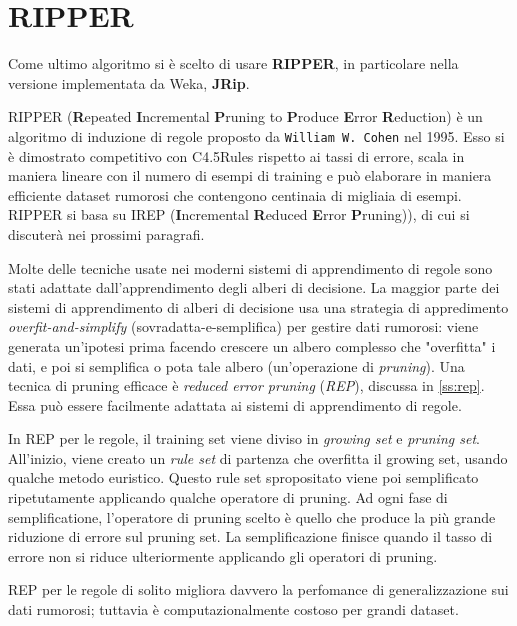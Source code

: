\chapter{RIPPER}
\label{ch:jrip}

Come ultimo algoritmo si è scelto di usare \textbf{RIPPER}\cite{Cohen95fasteffective}, in particolare nella versione implementata da Weka, \textbf{JRip}\cite{Witten:2011:DMP:1972514}.

RIPPER (\textbf{R}epeated \textbf{I}ncremental \textbf{P}runing to \textbf{P}roduce \textbf{E}rror \textbf{R}eduction) è un algoritmo di induzione di regole proposto da \verb|William W. Cohen| nel 1995. Esso si è dimostrato competitivo con C4.5Rules rispetto ai tassi di errore, scala in maniera lineare con il numero di esempi di training e può elaborare in maniera efficiente dataset rumorosi che contengono centinaia di migliaia di esempi. RIPPER si basa su IREP (\textbf{I}ncremental \textbf{R}educed \textbf{E}rror \textbf{P}runing))\cite{Furnkranz94incrementalreduced}, di cui si discuterà nei prossimi paragrafi.

Molte delle tecniche usate nei moderni sistemi di apprendimento di regole  sono stati adattate dall'apprendimento degli alberi di decisione. La maggior parte dei sistemi di apprendimento di alberi di decisione usa una strategia di appredimento \textit{overfit-and-simplify} (sovradatta-e-semplifica) per gestire dati rumorosi: viene generata un'ipotesi prima facendo crescere un albero complesso che "overfitta" i dati, e poi si semplifica o pota tale albero (un'operazione di \textit{pruning}). Una tecnica di pruning efficace è \textit{reduced error pruning} (\textit{REP}), discussa in \ref{ss:rep}. Essa può essere facilmente adattata ai sistemi di apprendimento di regole\cite{Pagallo1990}\cite{Brunk91aninvestigation}.

In REP per le regole, il training set viene diviso in \textit{growing set} e \textit{pruning set}. All'inizio, viene creato un \textit{rule set} di partenza che overfitta il growing set, usando qualche metodo euristico. Questo rule set spropositato viene poi semplificato ripetutamente applicando qualche operatore di pruning. Ad ogni fase di semplificatione, l'operatore di pruning scelto è quello che produce la più grande riduzione di errore sul pruning set. La semplificazione finisce quando il tasso di errore non si riduce ulteriormente applicando gli operatori di pruning.

REP per le regole di solito migliora davvero la perfomance di generalizzazione sui dati rumorosi\cite{Pagallo1990}\cite{Brunk91aninvestigation}\cite{Weiss91reducedcomplexity}\cite{Furnkranz94incrementalreduced}; tuttavia è computazionalmente costoso per grandi dataset\cite{Cohen93efficientpruning}.

